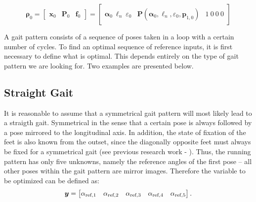 \documentclass[10pt,a4paper]{article}
\begin{document}
\begin{equation}
\bm{\rho}_0 = 
\left[
\begin{array}{c|c|c}
\bm{x}_0 & \bm{P}_0 & \bm{f}_0
\end{array}
\right]
=
\left[
\begin{array}{c|c|c}
\bm{\alpha}_0 ~ \bm{\ell}_n ~ \varepsilon_0  & 
\bm{P}(\bm{\alpha}_0, \bm{\ell}_n, \varepsilon_0, \bm{p}_{1,0}) & 
1~0~0~0
\end{array}
\right]
\end{equation}



A gait pattern consists of a sequence of poses taken in a loop with a certain number of cycles.
To find an optimal sequence of reference inputs, it is first necessary to define what is optimal.
This depends entirely on the type of gait pattern we are looking for. 
Two examples are presented below.


\subsection{Straight Gait}

It is reasonable to assume that a symmetrical gait pattern will most likely lead to a straigth gait.
Symmetrical in the sense that a certain pose is always followed by a pose mirrored to the longitudinal axis.
In addition, the state of fixation of the feet is also known from the outset, since the diagonally opposite feet must always be fixed for a symmetrical gait (see previous research work - \cite{PA_Schiller}).
Thus, the running pattern has only five unknowns, namely the reference angles of the first pose -- all other poses within the gait pattern are mirror images.
Therefore the variable to be optimized can be defined as:
\begin{equation}
\bm{y} = 
\begin{bmatrix}
\alpha_{\textnormal{ref},1}& \alpha_{\textnormal{ref},2}&\alpha_{\textnormal{ref},3}&\alpha_{\textnormal{ref},4}&\alpha_{\textnormal{ref},5}
\end{bmatrix} .
\end{equation}
\end{document}
